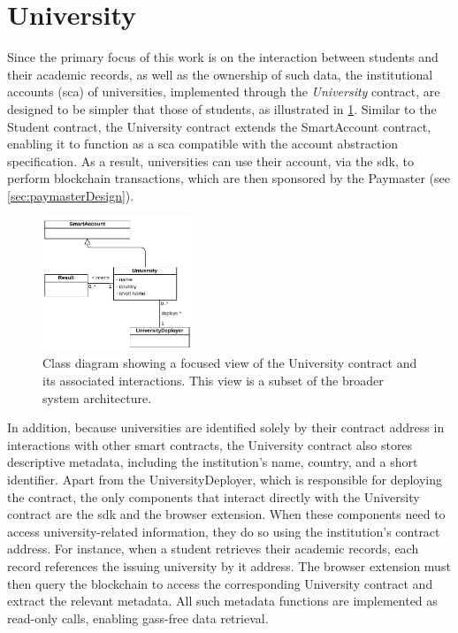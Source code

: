 \section{University}
Since the primary focus of this work is on the interaction between students and their academic records, as well as the ownership of such data, the institutional accounts (\gls{sca}) of universities, implemented through the \textit{University} contract, are designed to be simpler that those of students, as illustrated in \cref{fig:universityContractClass}. Similar to the Student contract, the University contract extends the SmartAccount contract, enabling it to function as a \gls{sca} compatible with the account abstraction specification. As a result, universities can use their account, via the \gls{sdk}, to perform blockchain transactions, which are then sponsored by the Paymaster (see \cref{sec:paymasterDesign}). 
\begin{figure}
  \centering
  \includegraphics[width=0.4\textwidth]{figures/University class diagram.pdf}
  \caption[Class diagram focused on University contract]{Class diagram showing a focused view of the University contract and its associated interactions. This view is a subset of the broader system architecture.}
  \label{fig:universityContractClass}
\end{figure}

In addition, because universities are identified solely by their contract address in interactions with other smart contracts, the University contract also stores descriptive metadata, including the institution's name, country, and a short identifier. Apart from the UniversityDeployer, which is responsible for deploying the contract, the only components that interact directly with the University contract are the \acrshort{sdk} and the browser extension. When these components need to access university-related information, they do so using the institution's contract address. For instance, when a student retrieves their academic records, each record references the issuing university by it address. The browser extension must then query the blockchain to access the corresponding University contract and extract the relevant metadata. All such metadata functions are implemented as read-only calls, enabling gass-free data retrieval.   

